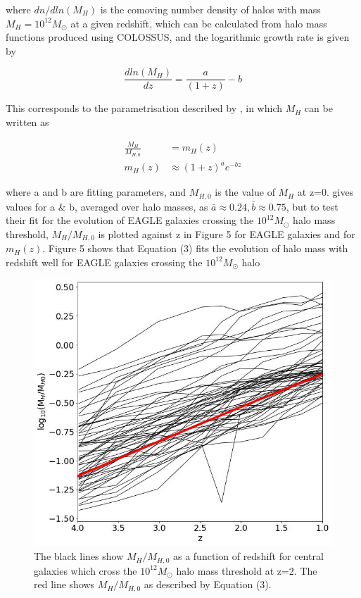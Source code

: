 \documentclass[12pt, twocolumn]{report}%
\begin{document}
\noindent where $dn/dln(M_H)$ is the comoving number density of halos with mass $M_H=10^{12}M_\odot$ at a given redshift, which can be calculated from halo mass functions produced using COLOSSUS, and the logarithmic growth rate is given by

\begin{equation}
    \frac{dln(M_H)}{dz}=\frac{a}{(1+z)}-b
\end{equation}

\noindent This corresponds to the parametrisation described by \cite{Correa}, in which $M_H$ can be written as

\begin{align}
    \frac{M_H}{M_{H,0}}&=m_H(z) \nonumber \\
    m_H(z)&\approx(1+z)^ae^{-bz}
\end{align}

\noindent where a and b are fitting parameters, and $M_{H,0}$ is the value of $M_H$ at z=0. \cite{Correa} gives values for a \& b, averaged over halo masses, as $\bar a \approx 0.24, \bar b \approx 0.75$, but to test their fit for the evolution of EAGLE galaxies crossing the $10^{12}M_\odot$ halo mass threshold, $M_H/M_{H,0}$ is plotted against z in Figure 5 for EAGLE galaxies and for $m_H(z)$. Figure 5 shows that Equation (3) fits the evolution of halo mass with redshift well for EAGLE galaxies crossing the $10^{12}M_\odot$ halo\\

\vspace{20cm}

\begin{figure}[H]
\centering
\includegraphics[width=\linewidth]{Plot_5.jpeg}
\caption{The black lines show $M_H/M_{H,0}$ as a function of redshift for central galaxies which cross the $10^{12}M_\odot$ halo mass threshold at z=2. The red line shows $M_H/M_{H,0}$ as described by Equation (3).}
\label{fig:5}
\end{figure}
\end{document}
